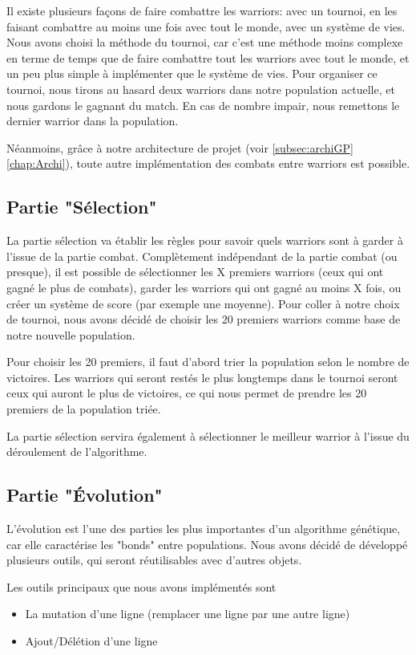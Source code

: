\documentclass[hidelinks]{report}
\begin{document}
Il existe plusieurs façons de faire combattre les warriors: avec un tournoi, en les faisant combattre au moins une fois avec tout le monde, avec un système de vies. Nous avons choisi la méthode du tournoi, car c'est une méthode moins complexe en terme de temps que de faire combattre tout les warriors avec tout le monde, et un peu plus simple à implémenter que le système de vies. Pour organiser ce tournoi, nous tirons au hasard deux warriors dans notre population actuelle, et nous gardons le gagnant du match. En cas de nombre impair, nous remettons le dernier warrior dans la population.

Néanmoins, grâce à notre architecture de projet (voir  \autoref{subsec:archiGP} \autoref{chap:Archi}), toute autre implémentation des combats entre warriors est possible.

\subsection{Partie "Sélection"}

La partie sélection va établir les règles pour savoir quels warriors sont à garder à l'issue de la partie combat. Complètement indépendant de la partie combat (ou presque), il est possible de sélectionner les X premiers warriors (ceux qui ont gagné le plus de combats), garder les warriors qui ont gagné au moins X fois, ou créer un système de score (par exemple une moyenne). Pour coller à notre choix de tournoi, nous avons décidé de choisir les 20 premiers warriors comme base de notre nouvelle population.

Pour choisir les 20 premiers, il faut d'abord trier la population selon le nombre de victoires. Les warriors qui seront restés le plus longtemps dans le tournoi seront ceux qui auront le plus de victoires, ce qui nous permet de prendre les 20 premiers de la population triée.

La partie sélection servira également à sélectionner le meilleur warrior à l'issue du déroulement de l'algorithme.

\subsection{Partie "Évolution"}
L'évolution est l'une des parties les plus importantes d'un algorithme génétique, car elle caractérise les "bonds" entre populations. Nous avons décidé de développé plusieurs outils, qui seront réutilisables avec d'autres objets.

Les outils principaux que nous avons implémentés sont
\begin{itemize}
    \item La mutation d'une ligne (remplacer une ligne par une autre ligne)
    \item Ajout/Délétion d'une ligne
\end{itemize}
\end{document}
